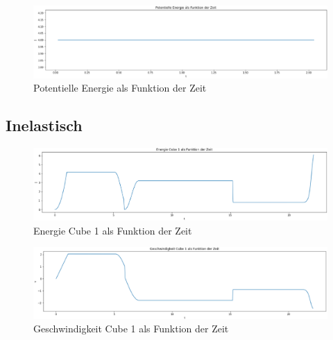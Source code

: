 \documentclass[../main.tex]{subfiles}
\begin{document}
    \begin{figure}[H]
        \begin{center}
            \centerline{\includegraphics[width=155mm]{./images/Elastisch/PotentielleEnergieAlsFunktionDerZeit}}
            \caption{Potentielle Energie als Funktion der Zeit}
            \label{fig:PotentielleEnergieAlsFunktionDerZeit}
        \end{center}
    \end{figure}

    \subsection{Inelastisch}

    \begin{figure}[H]
        \begin{center}
            \centerline{\includegraphics[width=155mm]{./images/Inelastisch/EnergieCube1AlsFunktionDerZeit}}
            \caption{Energie Cube 1 als Funktion der Zeit}
            \label{fig:EnergieCube1AlsFunktionDerZeit}
        \end{center}
    \end{figure}

    \begin{figure}[H]
        \begin{center}
            \centerline{\includegraphics[width=155mm]{./images/Inelastisch/GeschwindigkeitCube1AlFunktionDerZeit}}
            \caption{Geschwindigkeit Cube 1 als Funktion der Zeit}
            \label{fig:GeschwindigkeitCube1AlFunktionDerZeit}
        \end{center}
    \end{figure}
\end{document}
